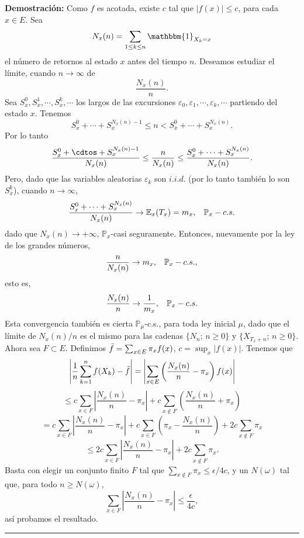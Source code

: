 \documentclass[a4paper]{article}
\newcommand{\prob}{\mathbb{P}}
\numberwithin{equation}{subsection}
\numberwithin{definicion}{subsection}
\def\E{\mathbb E}
\begin{document}
\textbf{Demostración: }Como $f$ es acotada, existe $c$ tal que $|f(x)|\leq c$, para cada $x\in E$. Sea
\[N_x(n) = \sum_{1\leq k\leq n}\mathbbm{1}_{X_k=x}\]
el número de retornos al estado $x$ antes del tiempo $n$. Deseamos estudiar el límite, cuando $n\rightarrow \infty$ de
\[\frac{N_x(n)}{n}.\]
Sea $S_x^0,S_x^1,\cdots,S_x^k,\cdots$ los largos de las excursiones $\varepsilon_0,\varepsilon_1,\cdots, \varepsilon_k,\cdots$ partiendo del estado $x$. Tenemos
\[S_x^0 + \cdots + S_x^{N_x(n)-1}\leq n < S_x^0+\cdots + S_x^{N_x(n)}.\]
Por lo tanto
\[\frac{S_x^0 + \cdtos + S_x^{N_x(n)-1}}{N_x(n)}\leq \frac{n}{N_x(n)}\leq \frac{S_x^0 + \cdots + S_x^{N_x(n)}}{N_x(n)}.\]
Pero, dado que las variables aleatorias $\varepsilon_k$ son $i.i.d.$ (por lo tanto también lo son $S_x^k$), cuando $n\rightarrow \infty$,
\[\frac{S_x^0+\cdots+ S_x^{N_x(n)}}{N_x(n)} \rightarrow \E_x(T_x) = m_x,\hspace{0.3cm}\prob_x-c.s.\]
dado que $N_x(n)\rightarrow +\infty$, $\prob_x$-casi seguramente. Entonces, nuevamente por la ley de los grandes números,
\[\frac{n}{N_x(n)}\rightarrow m_x,\hspace{0.3cm}\prob_x-c.s.,\]
esto es,
\[\frac{N_x(n)}{n}\rightarrow\frac{1}{m_x},\hspace{0.3cm}\prob_x-c.s.\]
Esta convergencia también es cierta $\prob_{\mu}$-c.s., para toda ley inicial $\mu$, dado que el límite de $N_x(n)/n$ es el mismo para las cadenas $\{N_n;\,n\geq 0\}$ y $\{X_{T_x+n};\,n\geq 0\}$.\\ \newline
Ahora sea $F\subset E$. Definimos $\Bar{f} = \sum_{x\in E}\pi_xf(x)$, $c=\sup_x|f(x)|$. Tenemos que
\[\left| \frac{1}{n}\sum_{k=1}^n f(X_k) - \Bar{f}\right| = \left| \sum_{x\in E}\left(\frac{N_x(n)}{n}-\pi_x\right)f(x)\right|\]
\[\leq c\sum_{x\in F}\left|\frac{N_x(n)}{n}-\pi_x\right| + c\sum_{x\notin F}\left(\frac{N_x(n)}{n} + \pi_x\right)\]
\[= c\sum_{x\in F}\left|\frac{N_x(n)}{n} -\pi_x\right| + c\sum_{x\in F}\left(\pi_x - \frac{N_x(n)}{n}\right) + 2c\sum_{x \notin F}\pi_x\]
\[\leq 2c \sum_{x \in F}\left| \frac{N_x(n)}{n}-\pi_x\right| + 2c\sum_{x \notin F}\pi_x.\]
Basta con elegir un conjunto finito $F$ tal que $\sum_{x \notin F}\pi_x\leq \epsilon/4c$, y un $N(\omega)$ tal que, para todo $n\geq N(\omega)$,
\[\sum_{x\in F}\left|\frac{N_x(n)}{n}-\pi_x\right| \leq \frac{\epsilon}{4c},\]
así probamos el resultado.\\
\rule{0.7em}{0.7em}\\ \newline
\end{document}
